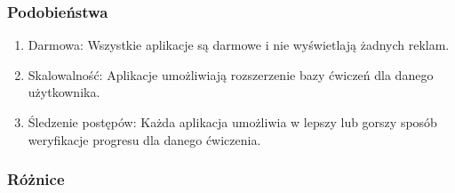 \documentclass{article}
\begin{document}
            \subsubsection*{Podobieństwa}
                  \begin{enumerate}
                        \item Darmowa: Wszystkie aplikacje są darmowe i nie wyświetlają żadnych reklam.
                        \item Skalowalność: Aplikacje umożliwiają rozszerzenie bazy ćwiczeń dla danego użytkownika.
                        \item Śledzenie postępów: Każda aplikacja umożliwia w lepszy lub gorszy sposób weryfikacje progresu dla danego ćwiczenia.
                  \end{enumerate}
            \subsubsection*{Różnice}
\end{document}
